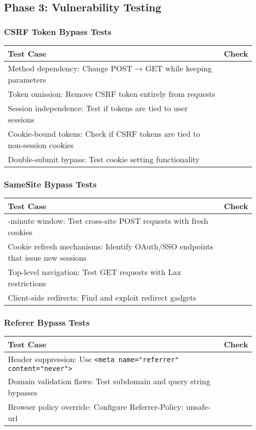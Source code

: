 \documentclass{article}
\begin{document}
\subsection*{Phase 3: Vulnerability Testing}

\subsubsection*{CSRF Token Bypass Tests}
\begin{tabular}{>{\raggedright\arraybackslash}p{}c}
    \toprule
    \textbf{Test Case} & \textbf{Check} \\
    \midrule
    Method dependency: Change POST → GET while keeping parameters  \\
    Token omission: Remove CSRF token entirely from requests & \\
    Session independence: Test if tokens are tied to user sessions  \\
    Cookie-bound tokens: Check if CSRF tokens are tied to non-session cookies  \\
    Double-submit bypass: Test cookie setting functionality  \\
    \bottomrule
\end{tabular}

\subsubsection*{SameSite Bypass Tests}
\begin{tabular}{>{\raggedright\arraybackslash}p{}c}
    \toprule
    \textbf{Test Case} & \textbf{Check} \\
    \midrule
    2-minute window: Test cross-site POST requests with fresh cookies  \\
    Cookie refresh mechanisms: Identify OAuth/SSO endpoints that issue new sessions  \\
    Top-level navigation: Test GET requests with Lax restrictions  \\
    Client-side redirects: Find and exploit redirect gadgets  \\
    \bottomrule
\end{tabular}

\subsubsection*{Referer Bypass Tests}
\begin{tabular}{>{\raggedright\arraybackslash}p{}c}
    \toprule
    \textbf{Test Case} & \textbf{Check} \\
    \midrule
    Header suppression: Use \texttt{<meta name="referrer" content="never">}  \\
    Domain validation flaws: Test subdomain and query string bypasses \\
    Browser policy override: Configure Referrer-Policy: unsafe-url  \\
    \bottomrule
\end{tabular}
\end{document}
